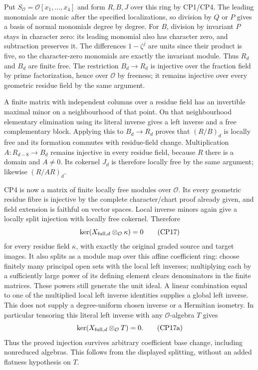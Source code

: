 Put $S_{\mathcal O}=\mathcal O[x_1,\ldots,x_4]$ and form $R,B,J$
over this ring by CP1/CP4. The leading monomials are monic after the
specified localizations, so division by $Q$ or $P$ gives a basis of
normal monomials degree by degree. For $B$, division by invariant
$P$ stays in character zero: its leading monomial also has character
zero, and subtraction preserves it. The differences $1-\zeta^j$ are
units since their product is five, so the character-zero monomials
are exactly the invariant module. Thus $R_d$ and $B_d$ are finite free.
The restriction $B_d\to R_d$ is injective over the fraction field
by prime factorization, hence over $\mathcal O$ by freeness; it remains
injective over every geometric residue field by the same argument.

A finite matrix with independent columns over a residue field has
an invertible maximal minor on a neighbourhood of that point. On
that neighbourhood elementary elimination using its literal inverse
gives a left inverse and a free complementary block. Applying this
to $B_d\to R_d$ proves that $(R/B)_d$ is locally free and its
formation commutes with residue-field change. Multiplication
$A:R_{d-8}\to B_d$ remains injective in every residue field, because
$R$ there is a domain and $A\ne0$. Its cokernel $J_d$ is therefore
locally free by the same argument; likewise $(R/AR)_d$.

CP4 is now a matrix of finite locally free modules over $\mathcal O$.
Its every geometric residue fibre is injective by the complete
character/chart proof already given, and field extension is faithful
on vector spaces. Local inverse minors again give a locally split
injection with locally free cokernel. Therefore
\[
 \ker(X_{{\rm full},d}\otimes_{\mathcal O}\kappa)=0                \tag{CP17}
\]
for every residue field $\kappa$, with exactly the original graded
source and target images. It also splits as a module map over this
affine coefficient ring: choose finitely many principal open sets
with the local left inverses; multiplying each by a sufficiently
large power of its defining element clears denominators in the
finite matrices. These powers still generate the unit ideal.
A linear combination equal to one of the multiplied local left
inverse identities supplies a global left inverse. This does not
supply a degree-uniform chosen inverse or a Hermitian isometry.
In particular tensoring this literal left inverse with any
$\mathcal O$-algebra $T$ gives
\[
 \ker(X_{{\rm full},d}\otimes_{\mathcal O}T)=0.\tag{CP17a}
\]
Thus the proved injection survives arbitrary coefficient base change,
including nonreduced algebras. This follows from the displayed splitting,
without an added flatness hypothesis on $T$.

